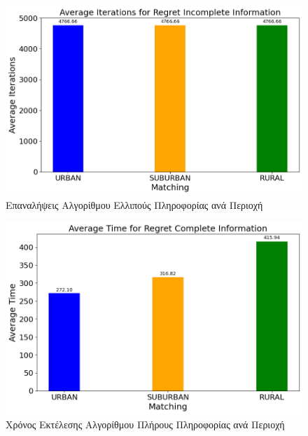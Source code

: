\begin{figure}[H]
    \centering
    \includegraphics[width=\textwidth]{figures/chapter4/Average_Iterations_per_area_RII.png}
    \caption{Επαναλήψεις Αλγορίθμου Ελλιπούς Πληροφορίας ανά Περιοχή}
    \label{fig42}
\end{figure}

\newpage

\begin{figure}[H]
    \centering
    \includegraphics[width=\textwidth]{figures/chapter4/Average_Time_per_area_RCI.png}
    \caption{Χρόνος Εκτέλεσης Αλγορίθμου Πλήρους Πληροφορίας ανά Περιοχή}
    \label{fig43}
\end{figure}

